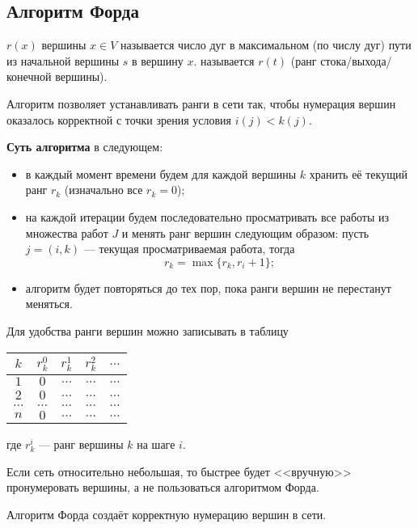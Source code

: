 \subsection{Алгоритм Форда}


 $r(x)$ вершины $x \in V$ называется число дуг в максимальном (по числу дуг) пути из начальной вершины $s$ в вершину $x$.  называется $r(t)$ (ранг стока/выхода/конечной вершины).

\algorithm[Форда]

Алгоритм позволяет устанавливать ранги в сети так, чтобы нумерация вершин оказалось корректной с точки зрения условия $i(j) < k(j)$.

\textbf{Суть алгоритма} в следующем:

\begin{itemize}[nosep]
	\item в каждый момент времени будем для каждой вершины $k$ хранить её текущий ранг $r_k$ (изначально все $r_k = 0$);
	
	\item на каждой итерации будем последовательно просматривать все работы из множества работ $J$ и менять ранг вершин следующим образом: пусть $j = (i, k)$ --- текущая просматриваемая работа, тогда
	\[
	r_k = \max\{r_k, r_i+1\};
	\]
	
	\item алгоритм будет повторяться до тех пор, пока ранги вершин не перестанут меняться.
\end{itemize}

Для удобства ранги вершин можно записывать в таблицу

\begin{table}[H]
	\centering
	\begin{tabular}{ | c | c | c | c | c | } 
		\hline
		$k$ & $r_k^0$ & $r_k^1$ & $r_k^2$ & $\dots$ \\\hline
		$1$ & $0$ & $\dots$ & $\dots$ & $\dots$ \\\hline
		$2$ & $0$ & $\dots$ & $\dots$ & $\dots$ \\\hline
		$\dots$ & $\dots$ & $\dots$ & $\dots$ & $\dots$ \\\hline
		$n$ & $0$ & $\dots$ & $\dots$ & $\dots$ \\\hline
	\end{tabular}
\end{table}

где $r_k^i$ --- ранг вершины $k$ на шаге $i$.

\remark

Если сеть относительно небольшая, то быстрее будет <<вручную>> пронумеровать вершины, а не пользоваться алгоритмом Форда.

\fact

Алгоритм Форда создаёт корректную нумерацию вершин в сети.
